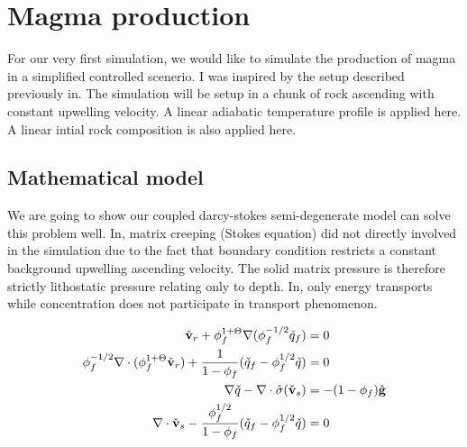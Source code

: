 \section{Magma production}
For our very first simulation, we would like to simulate the 
production of magma in a simplified controlled scenerio.
I was inspired by the setup described previously in\cite{ModellingMeltingRates}.
The simulation will be setup in a chunk of rock ascending
with constant upwelling velocity.
A linear adiabatic temperature profile is applied here.
A linear intial rock composition is also applied here.

\subsection{Mathematical model}
We are going to show our coupled darcy-stokes semi-degenerate model
can solve this problem well.
In\cite{ModellingMeltingRates}, matrix creeping (Stokes equation) did not directly
involved in the simulation due to the fact that boundary condition restricts a 
constant background upwelling ascending velocity.
The solid matrix pressure is therefore strictly lithostatic pressure relating 
only to depth.
In\cite{ModellingMeltingRates}, only energy transports while concentration does not
participate in transport phenomenon. 

\begin{equation}
		  \begin{aligned}
					 \check{\bold{v}}_r + \phi_f^{1+\Theta}\nabla (\phi_f^{-1/2}\check{q}_f) &= 0\\
					 \phi_f^{-1/2}\nabla \cdot (\phi_f^{1+\Theta} \check{\bold{v}}_r) + \frac{1}{1-\phi_f}(\check{q}_f - \phi_f^{1/2}\check{q}) &=0 \\
					 \nabla \check{q} - \nabla \cdot \hat{\sigma}(\check{\bold{v}}_s) &= -(1-\phi_f)\hat{\bold{g}} \\
					 \nabla \cdot \check{\bold{v}}_s - \frac{\phi_f^{1/2}}{1-\phi_f}(\check{q}_f - \phi_f^{1/2}\check{q}) &= 0
		  \end{aligned}
\end{equation}

